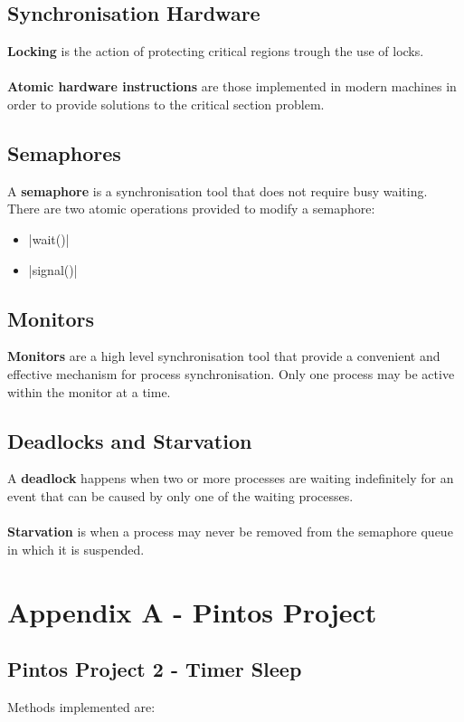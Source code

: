 \documentclass{article}
\begin{document}
\subsection{Synchronisation Hardware}
\textbf{Locking} is the action of protecting critical regions trough the use of locks. \\ \\
\textbf{Atomic hardware instructions} are those implemented in modern machines in order to provide solutions to the critical section problem.

\subsection{Semaphores}
A \textbf{semaphore} is a synchronisation tool that does not require busy waiting. There are two atomic operations provided to modify a semaphore:

\begin{itemize}
	\item \cverb|wait()|
	\item \cverb|signal()|
\end{itemize}

\subsection{Monitors}
\textbf{Monitors} are a high level synchronisation tool that provide a convenient and effective mechanism for process synchronisation. Only one process may be active within the monitor at a time.

\subsection{Deadlocks and Starvation}
A \textbf{deadlock} happens when two or more processes are waiting indefinitely for an event that can be caused by only one of the waiting processes. \\ \\
\textbf{Starvation} is when a process may never be removed from the semaphore queue in which it is suspended.

\newpage
\section{Appendix A - Pintos Project}
\subsection{Pintos Project 2 - Timer Sleep}
Methods implemented are:
\end{document}
